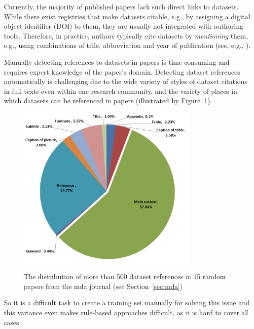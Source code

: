 \documentclass{IOS-Book-Article}
\begin{document}
Currently, the majority of published papers lack such direct links to datasets.
While there exist registries that make datasets citable, e.g., by assigning a digital object identifier (DOI) to them, they are usually not integrated with authoring tools.
Therefore, in practice, authors typically cite datasets by \emph{mentioning} them, e.g., using  
combinations of title, abbreviation and year of publication (see, e.g., \citet{Mathiak2015}).  

Manually detecting references to datasets in papers is time consuming and requires expert knowledge of the paper's domain. 
Detecting dataset references automatically is challenging 
due to the wide variety of styles of dataset citations in full texts even within one research community, and the variety
of places in which datasets can be referenced in papers  
(illustrated by Figure~\ref{fig:places-example}).  
\begin{figure}[h]
	\centering
	\includegraphics[width=3.5in]{DistPlaces4.PNG}
	\caption{The distribution of more than 500 dataset references in 15 random papers from the mda journal (see Section~\ref{sec:mda})}
	\label{fig:places-example}
\end{figure}
So it is a difficult task to create a training set manually for solving this issue and this variance even makes rule-based approaches difficult, as it is hard to cover all cases.
\end{document}

